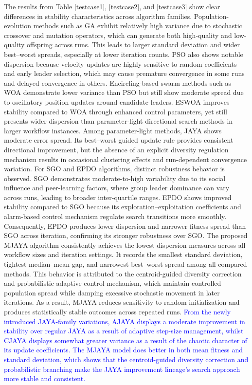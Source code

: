 \documentclass[3p,twocolumn]{elsarticle}
\theoremstyle{thmstyleone}%
\theoremstyle{thmstyletwo}%
\theoremstyle{thmstylethree}%
\begin{document}
The results from Table \ref{testcase1}, \ref{testcase2}, and \ref{testcase3} show clear differences in stability characteristics across algorithm families. Population-evolution methods such as GA exhibit relatively high variance due to stochastic crossover and mutation operators, which can generate both high-quality and low-quality offspring across runs. This leads to larger standard deviation and wider best–worst spreads, especially at lower iteration counts. PSO also shows notable dispersion because velocity updates are highly sensitive to random coefficients and early leader selection, which may cause premature convergence in some runs and delayed convergence in others. Encircling-based swarm methods such as WOA demonstrate lower variance than PSO but still show moderate spread due to oscillatory position updates around candidate leaders. ESWOA improves stability compared to WOA through enhanced control parameters, yet still presents wider dispersion than parameter-light directional search methods in larger workflow instances. Among parameter-light methods, JAYA shows moderate error spread. Its best–worst guided update rule provides consistent directional improvement, but the absence of an explicit diversity regulation mechanism results in occasional clustering effects and run-dependent convergence variation. For SGO and EPDO algorithms, distinct robustness behavior is observed. SGO demonstrates moderate-to-high variability due to its social influence and peer-learning factors, where group leader dominance can vary across runs, leading to broader inter-quartile ranges. EPDO shows improved stability compared to SGO because its exploration–exploitation coefficients and alarm-based control mechanism regulate search transitions more smoothly. Consequently, EPDO produces lower dispersion and narrower fitness spread than SGO across iteration, confirming its stronger robustness over SGO. The proposed MJAYA algorithm consistently achieves the lowest dispersion measures across all workflow sizes and iteration settings. It records the smallest standard deviation, tightest median–mean gap, and narrowest best–worst spread among all compared methods. This behavior is attributed to the centroid-guided diversity correction and probabilistic adaptive control mechanism, which maintain controlled population spread while damping excessive stochastic movement in later iterations. As a result, MJAYA reduces sensitivity to random initialization and produces statistically stable outcomes across repeated runs. \textcolor{blue}{From the newly introduced JAYA-family variations, AJAYA displays a moderate improvement in stability over regular JAYA as a result of adaptive step-size management, whilst CJAYA displays somewhat greater variance as a result of the chaotic character of its update coefficients. The MJAYA model does better in both mean fitness and standard deviation, which shows that the centroid-guided diversity correction and probabilistic branching make the JAYA improvement lineage's search approach more stable and consistent.}
\end{document}
